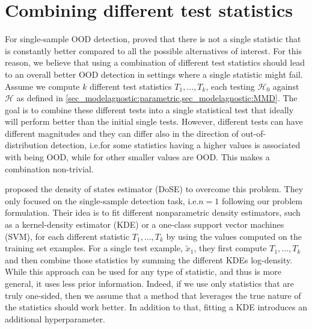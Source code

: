 {%

\section{Combining different test statistics}
\label{sec_modelagnostic:combination_p_values}
For single-sample OOD detection, \textcite{zhang_understanding_2021} proved that there is not a single statistic that is constantly better compared to all the possible alternatives of interest. For this reason, we believe that using a combination of different test statistics should lead to an overall better OOD detection in settings where a single statistic might fail. Assume we compute $k$ different test statistics $T_1,\dots, T_k$, each testing $\mathcal{H}_0$ against $\mathcal{H}$ as defined in \cref{sec_modelagnostic:parametric,sec_modelagnostic:MMD}. The goal is to combine these different tests into a single statistical test that ideally will perform better than the initial single tests. However, different tests can have different magnitudes and they can differ also in the direction of out-of-distribution detection, i.e.\@ for some statistics having a higher values is associated with being OOD, while for other smaller values are OOD. This makes a combination non-trivial.

\textcite{morningstar_density_2021} proposed the density of states estimator (DoSE) to overcome this problem. They only focused on the single-sample detection task, i.e.\@ $n=1$ following our problem formulation. Their idea is to fit different nonparametric density estimators, such as a kernel-density estimator (KDE) or a one-class support vector machines (SVM), for each different statistic $T_1,\dots, T_k$ by using the values computed on the training set examples. For a single test example, $\tilde{x}_1$, they first compute $T_1,\dots, T_k$ and then combine those statistics by summing the different KDEs log-density. %
While this approach can be used for any type of statistic, and thus is more general, it uses less prior information. Indeed, if we use only statistics that are truly one-sided, then we assume that a method that leverages the true nature of the statistics should work better. In addition to that, fitting a KDE introduces an additional hyperparameter.

}

